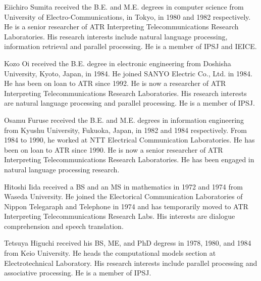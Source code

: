 \begin{biography}

\biotitle{}

{
Eiichiro Sumita received the B.E. and M.E. degrees in computer science
from University of Electro-Communications, in Tokyo, in 1980 and 1982
respectively. He is a senior researcher of ATR Interpreting
Telecommunications Research Laboratories. His research interests include
natural language processing, information retrieval and parallel
processing. He is a member of IPSJ and IEICE.
}

{
Kozo Oi received the B.E. degree in electronic engineering from Doshisha
University, Kyoto, Japan, in 1984. He joined SANYO Electric Co., Ltd. in
1984. He has been on loan to ATR since 1992. He is now a researcher of
ATR Interpreting Telecommunications Research Laboratories. His research
interests are natural language processing and parallel processing. He is
a member of IPSJ.
}

{
Osamu Furuse received the B.E. and M.E. degrees in information
engineering from Kyushu University, Fukuoka, Japan, in 1982 and 1984
respectively. From 1984 to 1990, he worked at NTT Electrical
Communication Laboratories. He has been on loan to ATR since 1990.
He is now a senior researcher of ATR Interpreting Telecommunications
Research Laboratories. He has been engaged in natural language
processing research.
}

{
Hitoshi Iida received a BS and an MS in mathematics in 1972 and 1974
from Waseda University. He joined the Electorical Communication\mbox{}
Laboratories of Nippon Telegaraph and Telephone in 1974 and has
temporarily moved to ATR Interpreting Telecommunications Research
Labs. His interests are dialogue comprehension and speech translation.
}

{
Tetsuya Higuchi received his BS, ME, and PhD degress in 1978, 1980, and
1984 from Keio University. He heads the computational models section at
Electrotechnical Laboratory. His research interests include parallel
processing and associative processing. He is a member of IPSJ.
}


\end{biography}



